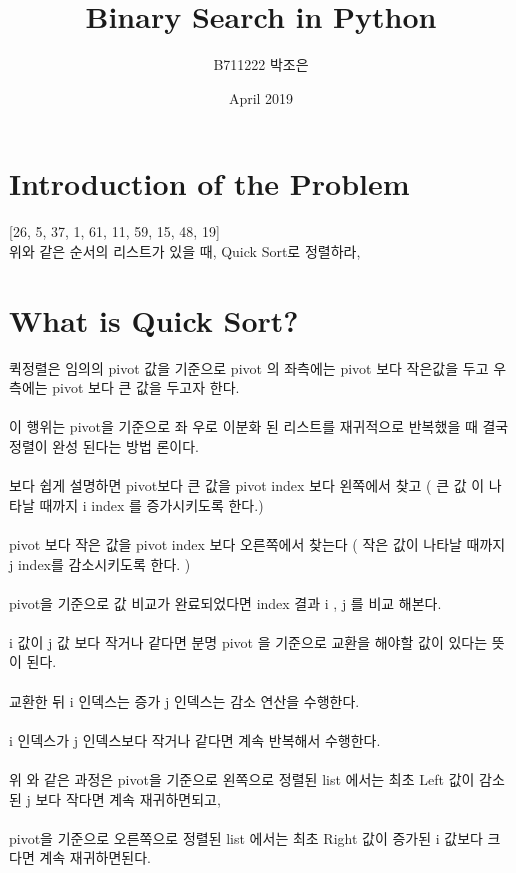 \documentclass{article}
\begin{document}
\title{Binary Search in Python}
\author{B711222 박조은}
\date{April 2019}
\maketitle

\section{Introduction of the Problem}
[26, 5, 37, 1, 61, 11, 59, 15, 48, 19] \\
위와 같은 순서의 리스트가 있을 때, Quick Sort로 정렬하라,

\section{What is Quick Sort?}
퀵정렬은 임의의 pivot 값을 기준으로 pivot 의 좌측에는 pivot 보다 작은값을 두고 우측에는 pivot 보다 큰 값을 두고자 한다.\\
\\
이 행위는 pivot을 기준으로 좌 우로 이분화 된 리스트를 재귀적으로 반복했을 때 결국 정렬이 완성 된다는 방법 론이다.\\
\\
보다 쉽게 설명하면 pivot보다 큰 값을 pivot index 보다 왼쪽에서 찾고 ( 큰 값 이 나타날 때까지 i index 를 증가시키도록 한다.)\\
\\
pivot 보다 작은 값을 pivot index 보다 오른쪽에서 찾는다 ( 작은 값이 나타날 때까지 j index를 감소시키도록 한다. )\\
\\
pivot을 기준으로 값 비교가 완료되었다면 index 결과 i , j 를 비교 해본다.\\
\\
i 값이 j 값 보다 작거나 같다면 분명 pivot 을 기준으로 교환을 해야할 값이 있다는 뜻이 된다.\\
\\
교환한 뒤 i 인덱스는 증가 j 인덱스는 감소 연산을 수행한다.\\
\\
i 인덱스가 j 인덱스보다 작거나 같다면 계속 반복해서 수행한다.\\
\\
위 와 같은 과정은 pivot을 기준으로 왼쪽으로 정렬된 list 에서는 최초 Left 값이 감소된 j 보다 작다면 계속 재귀하면되고,\\
\\
pivot을 기준으로 오른쪽으로 정렬된 list 에서는 최초 Right 값이 증가된 i 값보다 크다면 계속 재귀하면된다.\\
\\
\end{document}
